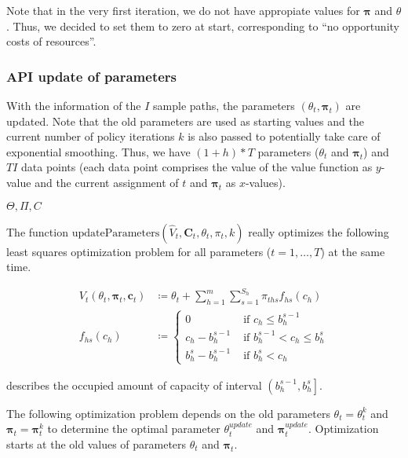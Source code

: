 Note that in the very first iteration, we do not have appropiate values for $\boldsymbol{\pi}$ and $\theta$. Thus, we decided to set them to zero at start, corresponding to \enquote{no opportunity costs of resources}.


\subsubsection{API update of parameters}\label{sec-updateParameter}

With the information of the $I$ sample paths, the parameters $\left(\theta_t, \boldsymbol{\pi}_t \right)$ are updated. Note that the old parameters are used as starting values and the current number of policy iterations $k$ is also passed to potentially take care of exponential smoothing. Thus, we have $(1+h)*T$ parameters ($\theta_t$ and $\boldsymbol{\pi}_t$) and $TI$ data points (each data point comprises the value of the value function as $y$-value and the current assignment of $t$ and $\boldsymbol{\pi}_t$ as $x$-values). 


$\Theta, \Pi, C$

The function $\text{updateParameters}\left(\hat{V}_t, \boldsymbol{\hat{C}}_t, \theta_t, \pi_t, k\right)$ really optimizes the following least squares optimization problem for all parameters ($t = 1, \dots, T$) at the same time.

\begin{align}
V_t(\theta_t, \boldsymbol{\pi}_t, \boldsymbol{c}_t) & \coloneqq \theta_t + \sum_{h=1}^{m}\sum_{s=1}^{S_h} \pi_{ths} f_{hs}(c_h) \\
f_{hs}(c_h) &\coloneqq 
\begin{cases}\label{def-f}
0 & \text{ if } c_h \leq b_h^{s-1}\\
c_h - b_h^{s-1} & \text{ if } b_h^{s-1} < c_h \leq b_h^s \\
b_h^s - b_h^{s-1} & \text{ if } b_h^s < c_h
\end{cases}
\end{align}

 describes the occupied amount of capacity of interval $\left(b_h^{s-1}, b_h^s\right]$.

The following optimization problem depends on the old parameters $\theta_t = \theta_t^k$ and $\boldsymbol{\pi}_t = \boldsymbol{\pi}_t^k$ to determine the optimal parameter $\theta_t^{update}$ and $\boldsymbol{\pi}_t^{update}$. Optimization starts at the old values of parameters $\theta_t$ and $\boldsymbol{\pi}_t$.

